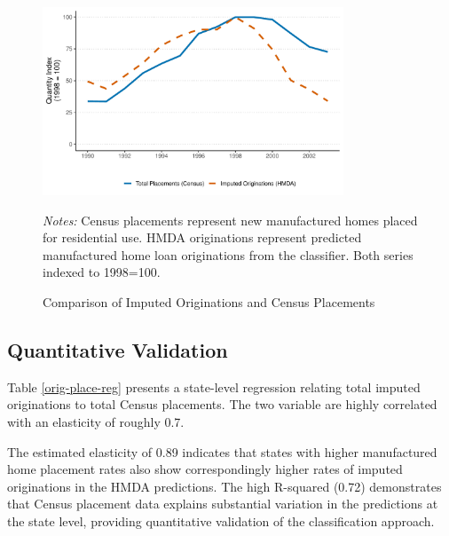 \documentclass[11pt]{article}
\begin{document}
\begin{figure}[htbp]
    \centering
    \caption{Comparison of Imputed Originations and Census Placements}
    \includegraphics[width=0.8\textwidth]{results/plots/orig_tot-place_tot.pdf}
    \begin{minipage}{0.8\textwidth}
    \begin{flushleft}
        \begin{footnotesize}
    \emph{Notes:  }Census placements represent new manufactured homes placed for residential use. HMDA originations represent predicted manufactured home loan originations from the classifier. Both series indexed to 1998=100.
        \end{footnotesize}
    \end{flushleft}
    \end{minipage}
    \label{fig:orig_place}
\end{figure}

\subsection{Quantitative Validation}

Table \ref{orig-place-reg} presents a state-level regression relating total imputed originations to total Census placements. The two variable are highly correlated with an elasticity of roughly 0.7. 



The estimated elasticity of 0.89 indicates that states with higher manufactured home placement rates also show correspondingly higher rates of imputed originations in the HMDA predictions. The high R-squared (0.72) demonstrates that Census placement data explains substantial variation in the predictions at the state level, providing quantitative validation of the classification approach.
\end{document}
